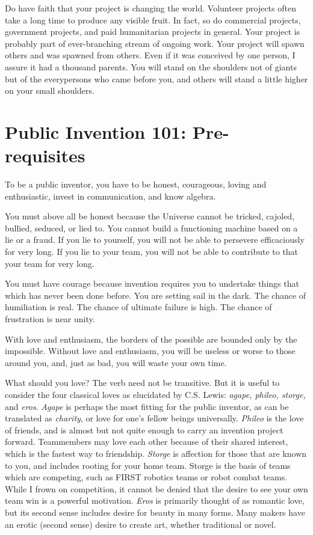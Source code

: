 \documentclass[
	fontsize=10pt, %
	twoside=false, %
	secnumdepth=1, %
]{kaobook}
\begin{document}
Do have faith that your project is changing the world. Volunteer projects often take a long time to produce any visible fruit. In fact, so do commercial projects, government projects, and paid humanitarian projects in general. Your project is probably part of ever-branching stream of ongoing work. Your project will spawn others and was spawned from others. Even if it was conceived by one person, I assure it had a thousand parents. You will stand on the shoulders not of giants but of the everypersons who came before you, and others will stand a little higher on your small shoulders.


\chapter{Public Invention 101: Pre-requisites}

To be a public inventor, you have to be honest,
courageous, loving and enthusiastic, invest in communication, and know algebra.

You must above all be honest because the
Universe cannot be tricked, cajoled, bullied,
seduced, or lied to.
You cannot build a functioning machine based on a
lie or a fraud.
If you lie to yourself, you will not be able
to persevere efficaciously for very long.
If you lie to your team, you will not be able
to contribute to that your team for very long.

You must have courage because invention requires you
to undertake things that
which has never been done before.
You are setting sail in the dark.
The chance of humiliation is real.
The chance of ultimate failure is high.
The chance of frustration is near unity.

With love and enthusiasm, the borders of the
possible are bounded only by the impossible.
Without love and enthusiasm, you will be useless
or worse to those around you, and, just as bad,
you will waste your own time.

What should you love? The verb need not be
transitive. But it is useful to consider
the four classical loves as elucidated by C.S. Lewis:
{\em agape, phileo, storge,} and {\em eros}.\cite{Lewis1960}
{\em Agape} is perhaps the most fitting for
the public inventor, as can be translated as {\em charity},
or love for one's fellow beings universally.
{\em Phileo} is the love of friends, and
is almost but not quite enough to carry an invention project forward.
Teammembers may love each other because of their
shared interest, which is the fastest way to friendship.
{\em Storge} is affection for those that are known to you,
and includes rooting for your home team.
Storge is the basis of teams which are competing, such
as FIRST robotics teams or robot combat teams.
While I frown on competition, it cannot be denied that
the desire to see your own team win is a powerful motivation.
{\em Eros} is primarily thought of as romantic love, but
its second sense includes desire for beauty in many forms.
Many makers have an erotic (second sense) desire
to create art, whether traditional or novel.
\end{document}
